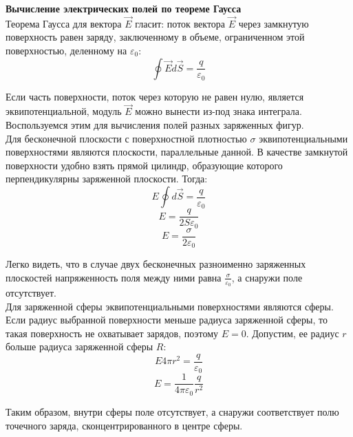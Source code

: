 \documentclass{article}
\begin{document}
	
	\textbf{Вычисление электрических полей по теореме Гаусса}\\

	Теорема Гаусса для вектора $\vec E$ гласит: поток вектора $\vec E$ через замкнутую поверхность равен заряду, заключенному в объеме, ограниченном этой поверхностью, деленному на $\varepsilon_0$:
	\begin{equation}
		\oint{\vec E d\vec S} = \frac{q}{\varepsilon_0}
	\end{equation}

	Если часть поверхности, поток через которую не равен нулю, является эквипотенциальной, модуль $\vec E$ можно вынести из-под знака интеграла. Воспользуемся этим для вычисления полей разных заряженных фигур.\\

	Для бесконечной плоскости с поверхностной плотностью $\sigma$ эквипотенциальными поверхностями являются плоскости, параллельные данной. В качестве замкнутой поверхности удобно взять прямой цилиндр, образующие которого перпендикулярны заряженной плоскости. Тогда:
	\begin{equation}
		E \oint{d \vec S} = \frac{q}{\varepsilon_0}
	\end{equation}
	\begin{equation}
		E = \frac{q}{2S\varepsilon_0}
	\end{equation}
	\begin{equation}
		E = \frac{\sigma}{2\varepsilon_0}
	\end{equation}

	Легко видеть, что в случае двух бесконечных разноименно заряженных плоскостей напряженность поля между ними равна $\frac{\sigma}{\varepsilon_0}$, а снаружи поле отсутствует.\\

	Для заряженной сферы эквипотенциальными поверхностями являются сферы. Если радиус выбранной поверхности меньше радиуса заряженной сферы, то такая поверхность не охватывает зарядов, поэтому $E=0$. Допустим, ее радиус $r$ больше радиуса заряженной сферы $R$:
	\begin{equation}
		E4\pi r^2 = \frac{q}{\varepsilon_0}
	\end{equation}
	\begin{equation}
		E = \frac{1}{4\pi\varepsilon_0}\frac{q}{r^2}
	\end{equation}

	Таким образом, внутри сферы поле отсутствует, а снаружи соответствует полю точечного заряда, сконцентрированного в центре сферы.\\
\end{document}
